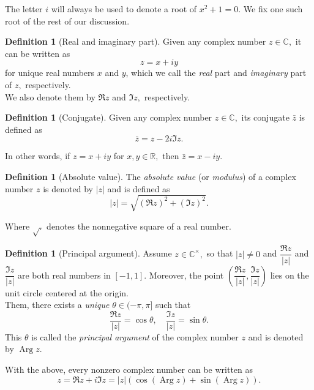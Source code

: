 \documentclass[12pt,oneside]{book}
\theoremstyle{definition}
\numberwithin{thm}{chapter}
\newtheorem{defn}[thm]{Definition}
\newcommand{\Arg}{\operatorname{Arg}}
\begin{document}
The letter $i$ will always be used to denote a root of $x^2 + 1 = 0.$ We fix one such root of the rest of our discussion.

\begin{defn}[Real and imaginary part]
	Given any complex number $z \in \mathbb{C},$ it can be written as
	\begin{equation*} 
		z = x + iy
	\end{equation*}
	for unique real numbers $x$ and $y$, which we call the \emph{real} part and \emph{imaginary} part of $z,$ respectively.\\
	We also denote them by $\Re z$ and $\Im z,$ respectively.
\end{defn}

\begin{defn}[Conjugate]
	Given any complex number $z \in \mathbb{C},$ its conjugate $\bar{z}$ is defined as
	\begin{equation*} 
		\bar{z} = z - 2i\Im z.
	\end{equation*}
\end{defn}
In other words, if $z = x + iy$ for $x, y \in \mathbb{R},$ then $\bar{z} = x - iy.$

\begin{defn}[Absolute value]
	The \emph{absolute value} (or \emph{modulus}) of a complex number $z$ is denoted by $|z|$ and is defined as
	\begin{equation*} 
		|z| = \sqrt{(\Re z)^2 + (\Im z)^2}.
	\end{equation*}
\end{defn}
Where $\sqrt{.}$ denotes the nonnegative square of a real number.

\begin{defn}[Principal argument]
	Assume $z \in \mathbb{C}^\times,$ so that $|z| \neq 0$ and $\dfrac{\Re z}{|z|}$ and $\dfrac{\Im z}{|z|}$ are both real numbers in $[-1, 1].$ Moreover, the point $\left(\dfrac{\Re z}{|z|}, \dfrac{\Im z}{|z|}\right)$ lies on the unit circle centered at the origin.\\
	Them, there exists a \emph{unique} $\theta \in (-\pi, \pi]$ such that
	\begin{equation*} 
		\dfrac{\Re z}{|z|} = \cos \theta,\quad \dfrac{\Im z}{|z|} = \sin \theta.
	\end{equation*}
	This $\theta$ is called the \emph{principal argument} of the complex number $z$ and is denoted by $\Arg z.$
\end{defn}

With the above, every nonzero complex number can be written as
\begin{equation*} 
	z = \Re z + i\Im z = |z|\left(\cos\left(\Arg z\right) + \sin\left(\Arg z\right)\right).
\end{equation*}
\end{document}
